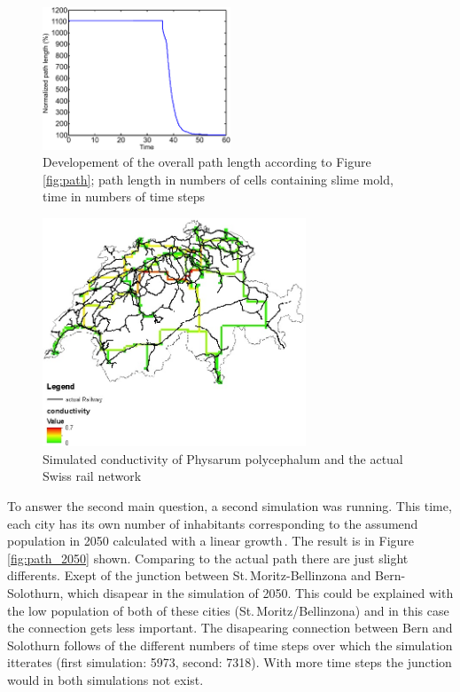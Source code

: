 \documentclass[11pt]{scrartcl}
\begin{document}
\begin{figure}[H]
	\centering
	\includegraphics[width=0.5\textwidth]{figures/plottrail1}
	\caption{Developement of the overall path length according to Figure\,\ref{fig:path}; path length in numbers of cells containing slime mold, time in numbers of time steps}
	\label{fig:plottrail}
\end{figure}

\begin{figure}[H]
	\centering
	\includegraphics[width=0.7\textwidth]{figures/conductivity_railway}
	\caption{Simulated conductivity of Physarum polycephalum and the actual Swiss rail network}
	\label{fig:conductivity}
\end{figure}

To answer the second main question, a second simulation was running. This time, each city has its own number of inhabitants corresponding to the assumend population in 2050 calculated with a linear growth\,\cite{bfs}. The result is in Figure\,\ref{fig:path_2050} shown. Comparing to the actual path there are just slight differents. Exept of the junction between St.\,Moritz-Bellinzona and Bern-Solothurn, which disapear in the simulation of 2050. This could be explained with the low population of both of these cities (St.\,Moritz/Bellinzona) and in this case the connection gets less important. The disapearing connection between Bern and Solothurn follows of the different numbers of time steps over which the simulation itterates (first simulation: 5973, second: 7318). With more time steps the junction would in both simulations not exist.
\end{document}
